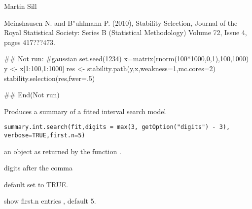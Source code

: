 \documentclass[letterpaper]{book}
\begin{document}
%
\begin{Author}\relax
Martin Sill \bsl{}
\end{Author}
%
\begin{References}\relax
Meinshausen N. and B\bsl{}"uhlmann P. (2010), Stability Selection, Journal of the Royal Statistical Society: Series B (Statistical Methodology) Volume 72, Issue 4, pages 417???473.
\end{References}
%
\begin{SeeAlso}\relax
\end{SeeAlso}
%
\begin{Examples}
\begin{ExampleCode}
## Not run: 
#gaussian
set.seed(1234)
x=matrix(rnorm(100*1000,0,1),100,1000)
y <- x[1:100,1:1000]%
res <- stability.path(y,x,weakness=1,mc.cores=2)
stability.selection(res,fwer=.5)

## End(Not run)
\end{ExampleCode}
\end{Examples}
%
\begin{Description}\relax
Produces a summary of a fitted interval search model
\end{Description}
%
\begin{Usage}
\begin{verbatim}
summary.int.search(fit,digits = max(3, getOption("digits") - 3), verbose=TRUE,first.n=5)

\end{verbatim}
\end{Usage}
%
\begin{Arguments}
\begin{ldescription}
\item[\code{fit}]  an object as returned by the function .
\item[\code{digits}]  digits after the comma 
\item[\code{verbose}]  default set to TRUE.  
\item[\code{first.n}]  show first.n entries , default 5. 
\end{ldescription}
\end{Arguments}
%
\end{document}
